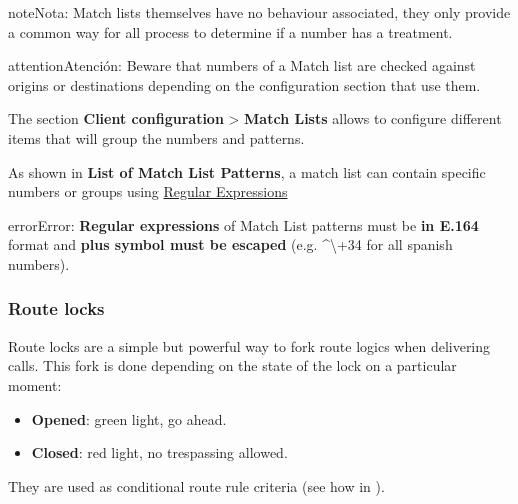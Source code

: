 \documentclass[letterpaper,10pt,spanish]{sphinxmanual}
\begin{document}
\begin{notice}{note}{Nota:}
Match lists themselves have no behaviour associated, they only provide
a common way for all process to determine if a number has a treatment.
\end{notice}

\begin{notice}{attention}{Atención:}
Beware that numbers of a Match list are checked against origins
or destinations depending on the configuration section that use them.
\end{notice}

The section \textbf{Client configuration} \textgreater{} \textbf{Match Lists} allows to configure
different items that will group the numbers and patterns.

As shown in \textbf{List of Match List Patterns}, a match list can contain specific numbers or groups using
\href{http://php.net/manual/en/reference.pcre.pattern.syntax.php}{Regular Expressions}

\begin{notice}{error}{Error:}
\textbf{Regular expressions} of Match List patterns must be \textbf{in E.164} format and \textbf{plus symbol must be
escaped} (e.g. \textasciicircum{}\textbackslash{}+34 for all spanish numbers).
\end{notice}
\label{administration_portal/client/vpbx/routing_tools/route_locks:route-locks}

\subsubsection{Route locks}
\label{administration_portal/client/vpbx/routing_tools/route_locks:id2}\label{administration_portal/client/vpbx/routing_tools/route_locks:route-locks}\label{administration_portal/client/vpbx/routing_tools/route_locks::doc}\label{administration_portal/client/vpbx/routing_tools/route_locks:id1}
Route locks are a simple but powerful way to fork route logics when delivering calls. This fork is done depending on the
state of the lock on a particular moment:
\begin{itemize}
\item {} 
\textbf{Opened}: green light, go ahead.

\item {} 
\textbf{Closed}: red light, no trespassing allowed.

\end{itemize}

They are used as conditional route rule criteria (see how in {\hyperref[administration_portal/client/vpbx/routing_endpoints/conditional_routes:conditional\string-routes]{}}).
\end{document}
